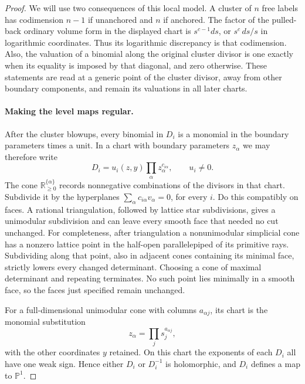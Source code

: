 \begin{proof}
We will use two consequences of this local model. A cluster of $n$ free
labels has codimension $n-1$ if unanchored and $n$ if anchored. The factor
of the pulled-back ordinary volume form in the displayed chart is
$s^{c-1}ds$, or $s^c\,ds/s$ in logarithmic coordinates. Thus its
logarithmic discrepancy is that codimension. Also, the valuation of a
binomial along the original cluster divisor is one exactly when its
equality is imposed by that diagonal, and zero otherwise. These statements
are read at a generic point of the cluster divisor, away from other
boundary components, and remain its valuations in all later charts.

\paragraph{Making the level maps regular.}
After the cluster blowups, every binomial in $D_i$ is a monomial in the
boundary parameters times a unit. In a chart with boundary parameters
$z_\alpha$ we may therefore write
\[
 D_i=u_i(z,y)\prod_\alpha z_\alpha^{c_{i\alpha}},
 \qquad u_i\ne0.
\]
The cone $\mathbb R_{\ge0}^{\{\alpha\}}$ records nonnegative combinations
of the divisors in that chart. Subdivide it by the hyperplanes
$\sum_\alpha c_{i\alpha}v_\alpha=0$, for every $i$. Do this compatibly on
faces. A rational triangulation, followed by lattice star subdivisions,
gives a unimodular subdivision and can leave every smooth face that needed
no cut unchanged. For completeness, after triangulation a nonunimodular
simplicial cone has a nonzero lattice point in the half-open parallelepiped
of its primitive rays. Subdividing along that point, also in adjacent cones
containing its minimal face, strictly lowers every changed determinant.
Choosing a cone of maximal determinant and repeating terminates. No such
point lies minimally in a smooth face, so the faces just specified remain
unchanged.

For a full-dimensional unimodular cone with columns
$a_{\alpha j}$, its chart is the monomial substitution
\[
 z_\alpha=\prod_j s_j^{a_{\alpha j}},
\]
with the other coordinates $y$ retained. On this chart the exponents of
each $D_i$ all have one weak sign. Hence either $D_i$ or $D_i^{-1}$ is
holomorphic, and $D_i$ defines a map to $\mathbb P^1$.


\end{proof}
